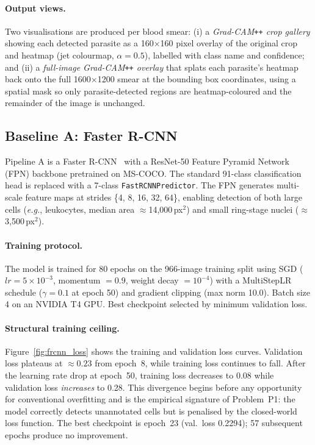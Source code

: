 \documentclass[review,12pt]{elsarticle}
\newcommand{\eg}{\textit{e.g.}}
\begin{document}
\paragraph{Output views.}
Two visualisations are produced per blood smear:
(i) a \textit{Grad-CAM\texttt{++} crop gallery} showing each detected
parasite as a 160$\times$160 pixel overlay of the original crop and
heatmap (jet colourmap, $\alpha = 0.5$), labelled with class name and
confidence; and
(ii) a \textit{full-image Grad-CAM\texttt{++} overlay} that splats each
parasite's heatmap back onto the full 1600$\times$1200 smear at the
bounding box coordinates, using a spatial mask so only parasite-detected
regions are heatmap-coloured and the remainder of the image is unchanged.

\subsection{Baseline A: Faster R-CNN}
\label{ssec:baseline}

Pipeline A is a Faster R-CNN~\cite{ren2015} with a ResNet-50 Feature
Pyramid Network (FPN) backbone pretrained on MS-COCO. The standard 91-class
classification head is replaced with a 7-class \texttt{FastRCNNPredictor}.
The FPN generates multi-scale feature maps at strides \{4, 8, 16, 32, 64\},
enabling detection of both large cells (\eg, leukocytes, median area
$\approx$14,000\,px$^2$) and small ring-stage nuclei ($\approx$3,500\,px$^2$).

\paragraph{Training protocol.}
The model is trained for 80 epochs on the 966-image training split using
SGD ($lr = 5 \times 10^{-3}$, momentum $= 0.9$, weight decay $= 10^{-4}$)
with a MultiStepLR schedule ($\gamma = 0.1$ at epoch 50) and gradient
clipping (max norm 10.0). Batch size 4 on an NVIDIA T4 GPU. Best checkpoint
selected by minimum validation loss.

\paragraph{Structural training ceiling.}
Figure~\ref{fig:frcnn_loss} shows the training and validation loss curves.
Validation loss plateaus at $\approx 0.23$ from epoch~8, while training
loss continues to fall. After the learning rate drop at epoch~50, training
loss decreases to 0.08 while validation loss \emph{increases} to 0.28.
This divergence begins before any opportunity for conventional overfitting
and is the empirical signature of Problem~P1: the model correctly detects
unannotated cells but is penalised by the closed-world loss function. The
best checkpoint is epoch~23 (val.\ loss 0.2294); 57 subsequent epochs
produce no improvement.
\end{document}
